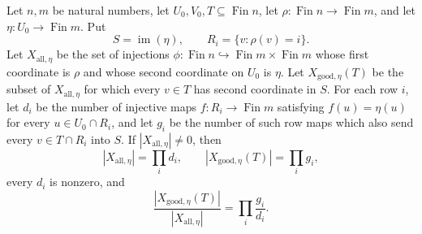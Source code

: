 \begin{helper}
Let \(n,m\) be natural numbers, let \(U_0,V_0,T\subseteq \operatorname{Fin} n\),
let \(\rho:\operatorname{Fin}n\to \operatorname{Fin}m\), and let
\(\eta:U_0\to \operatorname{Fin}m\).  Put
\[
S=\operatorname{im}(\eta),\qquad
R_i=\{v:\rho(v)=i\}.
\]
Let \(X_{\mathrm{all},\eta}\) be the set of injections
\(\phi:\operatorname{Fin}n\hookrightarrow \operatorname{Fin}m\times
\operatorname{Fin}m\) whose first coordinate is \(\rho\) and whose second
coordinate on \(U_0\) is \(\eta\).  Let \(X_{\mathrm{good},\eta}(T)\) be
the subset of \(X_{\mathrm{all},\eta}\) for which every \(v\in T\) has
second coordinate in \(S\).  For each row \(i\), let \(d_i\) be the number
of injective maps \(f:R_i\to\operatorname{Fin}m\) satisfying
\(f(u)=\eta(u)\) for every \(u\in U_0\cap R_i\), and let \(g_i\) be the
number of such row maps which also send every \(v\in T\cap R_i\) into
\(S\).  If \(|X_{\mathrm{all},\eta}|\ne0\), then
\[
|X_{\mathrm{all},\eta}|=\prod_i d_i,\qquad
|X_{\mathrm{good},\eta}(T)|=\prod_i g_i,
\]
every \(d_i\) is nonzero, and
\[
\frac{|X_{\mathrm{good},\eta}(T)|}{|X_{\mathrm{all},\eta}|}
=\prod_i\frac{g_i}{d_i}.
\]
\end{helper}

